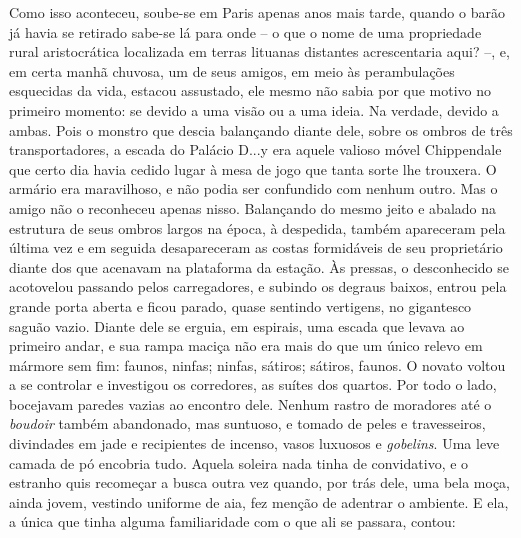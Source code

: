 Como isso aconteceu, soube-se em Paris apenas anos mais tarde, quando o
barão já havia se retirado sabe-se lá para onde -- o que o nome de uma
propriedade rural aristocrática localizada em terras lituanas distantes
acrescentaria aqui? --, e, em certa manhã chuvosa, um de seus amigos, em
meio às perambulações esquecidas da vida, estacou assustado, ele mesmo
não sabia por que motivo no primeiro momento: se devido a uma visão ou a
uma ideia. Na verdade, devido a ambas. Pois o monstro que descia
balançando diante dele, sobre os ombros de três transportadores, a
escada do Palácio D...y era aquele valioso móvel Chippendale que certo
dia havia cedido lugar à mesa de jogo que tanta sorte lhe trouxera. O
armário era maravilhoso, e não podia ser confundido com nenhum outro.
Mas o amigo não o reconheceu apenas nisso. Balançando do mesmo jeito e
abalado na estrutura de seus ombros largos na época, à despedida, também
apareceram pela última vez e em seguida desapareceram as costas
formidáveis de seu proprietário diante dos que acenavam na plataforma da
estação. Às pressas, o desconhecido se acotovelou passando pelos
carregadores, e subindo os degraus baixos, entrou pela grande porta
aberta e ficou parado, quase sentindo vertigens, no gigantesco saguão
vazio. Diante dele se erguia, em espirais, uma escada que levava ao
primeiro andar, e sua rampa maciça não era mais do que um único relevo
em mármore sem fim: faunos, ninfas; ninfas, sátiros; sátiros, faunos. O
novato voltou a se controlar e investigou os corredores, as suítes dos
quartos. Por todo o lado, bocejavam paredes vazias ao encontro dele.
Nenhum rastro de moradores até o \emph{boudoir} também abandonado, mas
suntuoso, e tomado de peles e travesseiros, divindades em jade e
recipientes de incenso, vasos luxuosos e \emph{gobelins}. Uma leve
camada de pó encobria tudo. Aquela soleira nada tinha de convidativo, e
o estranho quis recomeçar a busca outra vez quando, por trás dele, uma
bela moça, ainda jovem, vestindo uniforme de aia, fez menção de adentrar
o ambiente. E ela, a única que tinha alguma familiaridade com o que ali
se passara, contou:

